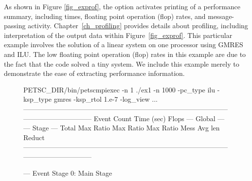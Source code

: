 {{As shown in Figure \ref{fig_exprof}, the option  activates printing of a performance summary, including
times, floating point operation (flop) rates, and message-passing
activity.  Chapter~\ref{ch_profiling}
provides details about profiling, including interpretation of the
output data within Figure~\ref{fig_exprof}.  This particular example involves the solution of a linear
system on one processor using GMRES and ILU.  The low floating point
operation (flop) rates in this example are due to the fact that the
code solved a tiny system.  We include this example merely to
demonstrate the ease of extracting performance information.

\begin{figure}[H]
{
  \begin{outputlisting}[\fontsize{7.5pt}{8pt}\ttfamily]
$ $PETSC_DIR/bin/petscmpiexec -n 1 ./ex1 -n 1000 -pc_type ilu -ksp_type gmres -ksp_rtol 1.e-7 -log_view
...
------------------------------------------------------------------------------------------------------------------------
Event                Count      Time (sec)     Flops                             --- Global ---  --- Stage ---   Total
                   Max Ratio  Max     Ratio   Max  Ratio  Mess   Avg len Reduct  %
------------------------------------------------------------------------------------------------------------------------

--- Event Stage 0: Main Stage


\end{outputlisting}}
\end{figure}}}
